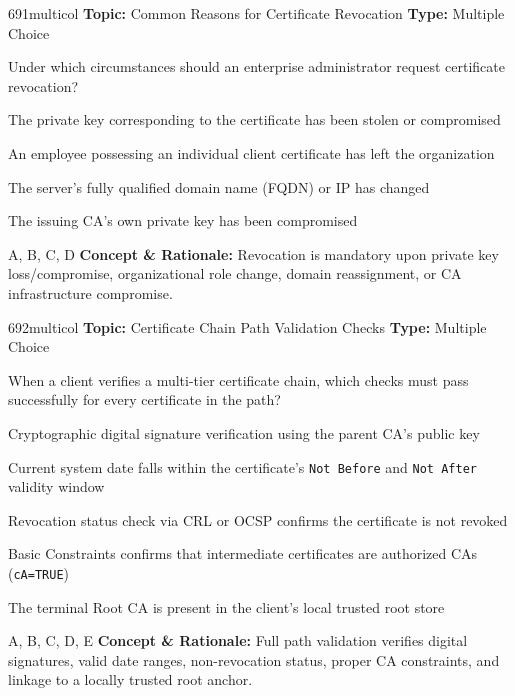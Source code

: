 \begin{qcard}{691}{multicol}
\textcolor{darkslate!75}{\small\textbf{Topic:} Common Reasons for Certificate Revocation \hfill \textbf{Type:} Multiple Choice}\vspace{0.4em}\par
Under which circumstances should an enterprise administrator request certificate revocation?
\begin{qoptions}
\item The private key corresponding to the certificate has been stolen or compromised
\item An employee possessing an individual client certificate has left the organization
\item The server's fully qualified domain name (FQDN) or IP has changed
\item The issuing CA's own private key has been compromised
\end{qoptions}
\end{qcard}
\nopagebreak
\begin{explainbox}{A, B, C, D}
\textbf{Concept \& Rationale:} Revocation is mandatory upon private key loss/compromise, organizational role change, domain reassignment, or CA infrastructure compromise.
\end{explainbox}

\begin{qcard}{692}{multicol}
\textcolor{darkslate!75}{\small\textbf{Topic:} Certificate Chain Path Validation Checks \hfill \textbf{Type:} Multiple Choice}\vspace{0.4em}\par
When a client verifies a multi-tier certificate chain, which checks must pass successfully for every certificate in the path?
\begin{qoptions}
\item Cryptographic digital signature verification using the parent CA's public key
\item Current system date falls within the certificate's \texttt{Not Before} and \texttt{Not After} validity window
\item Revocation status check via CRL or OCSP confirms the certificate is not revoked
\item Basic Constraints confirms that intermediate certificates are authorized CAs (\texttt{cA=TRUE})
\item The terminal Root CA is present in the client's local trusted root store
\end{qoptions}
\end{qcard}
\nopagebreak
\begin{explainbox}{A, B, C, D, E}
\textbf{Concept \& Rationale:} Full path validation verifies digital signatures, valid date ranges, non-revocation status, proper CA constraints, and linkage to a locally trusted root anchor.
\end{explainbox}


